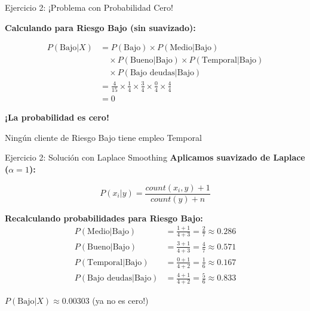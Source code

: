 \documentclass{beamer}
\begin{document}
\begin{frame}{Ejercicio 2: ¡Problema con Probabilidad Cero!}
    \begin{center}
        \textbf{Calculando para Riesgo Bajo (sin suavizado):}
    \end{center}

    \begin{align*}
    P(\text{Bajo}|X) &= P(\text{Bajo}) \times P(\text{Medio}|\text{Bajo}) \\
    &\quad \times P(\text{Bueno}|\text{Bajo}) \times P(\text{Temporal}|\text{Bajo}) \\
    &\quad \times P(\text{Bajo deudas}|\text{Bajo}) \\
    &= \frac{4}{15} \times \frac{1}{4} \times \frac{3}{4} \times \frac{0}{4} \times \frac{4}{4} \\
    &= 0
    \end{align*}

    \vspace{0.5cm}

    \begin{center}
        \textcolor{accent}{\textbf{¡La probabilidad es cero!}}

        Ningún cliente de Riesgo Bajo tiene empleo Temporal
    \end{center}
\end{frame}

\begin{frame}{Ejercicio 2: Solución con Laplace Smoothing}
    \textbf{Aplicamos suavizado de Laplace ($\alpha = 1$):}

    \[
    P(x_i|y) = \frac{count(x_i, y) + 1}{count(y) + n}
    \]

    \vspace{0.3cm}

    \textbf{Recalculando probabilidades para Riesgo Bajo:}
    \begin{align*}
    P(\text{Medio}|\text{Bajo}) &= \frac{1 + 1}{4 + 3} = \frac{2}{7} \approx 0.286 \\
    P(\text{Bueno}|\text{Bajo}) &= \frac{3 + 1}{4 + 3} = \frac{4}{7} \approx 0.571 \\
    P(\text{Temporal}|\text{Bajo}) &= \frac{0 + 1}{4 + 2} = \frac{1}{6} \approx 0.167 \\
    P(\text{Bajo deudas}|\text{Bajo}) &= \frac{4 + 1}{4 + 2} = \frac{5}{6} \approx 0.833
    \end{align*}

    \begin{center}
        $P(\text{Bajo}|X) \approx 0.00303$ (ya no es cero!)
    \end{center}
\end{frame}
\end{document}
